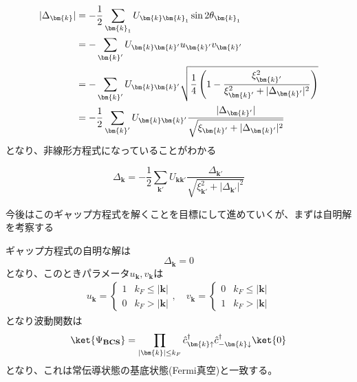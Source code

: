 \documentclass[dvipdfmx, 11pt, a4paper]{jsarticle}
\numberwithin{equation}{section}
\theoremstyle{definition}
\begin{document}
    \begin{align}
        |\Delta_{\bm{k}}|  &= - \frac{1}{2} \sum_{\bm{k}_1} U_{\bm{k}\bm{k}_1}  \sin 2 \theta_{\bm{k}_1} \notag \\
        &=  -  \sum_{\bm{k}'} U_{\bm{k}\bm{k}'} u_{\bm{k}'} v_{\bm{k}'} \notag \\
        &= -  \sum_{\bm{k}'} U_{\bm{k}\bm{k}'} \sqrt{\frac{1}{4}\left( 1 - \frac{\xi_{\bm{k}'}^2}{\xi_{\bm{k}'}^2 + |\Delta_{\bm{k}'}|^2} \right)} \notag \\
        &= - \frac{1}{2} \sum_{\bm{k}'} U_{\bm{k}\bm{k}'} \frac{|\Delta_{\bm{k}'}|}{\sqrt{\xi_{\bm{k}'}+|\Delta_{\bm{k}'}|^2}}
    \end{align}
    となり、非線形方程式になっていることがわかる
    \begin{definition}[絶対零度におけるギャップ方程式]
        \begin{equation}
            \Delta_{\bm{k}} = - \frac{1}{2} \sum_{\bm{k}'} U_{\bm{k}\bm{k}'} \frac{\Delta_{\bm{k}'}}{\sqrt{\xi_{\bm{k}'}^2+|\Delta_{\bm{k}'}|^2}}
        \end{equation}
    \end{definition}
    今後はこのギャップ方程式を解くことを目標にして進めていくが、まずは自明解を考察する
    \begin{note}[ギャップ方程式の自明解]
        ギャップ方程式の自明な解は
        \begin{equation}
            \Delta_{\bm{k}} = 0
        \end{equation}
        となり、このときパラメータ$u_{\bm{k}},v_{\bm{k}}$は
        \begin{align}
            u_{\bm{k}} = 
            \left\{
            \begin{matrix}
                1&k_F \le |\bm{k}|\\
                0&k_F > |\bm{k}|
            \end{matrix}
            \right.,\quad 
            v_{\bm{k}} = 
            \left\{
            \begin{matrix}
                0&k_F \le |\bm{k}|\\
                1&k_F > |\bm{k}|
            \end{matrix}
            \right.
        \end{align}
        となり波動関数は
        \begin{align}
            \ket{\Psi_{\textbf{BCS}}} = \prod_{|\bm{k}| \le k_F} \hat{c}_{\bm{k}\uparrow}^\dagger \hat{c}_{-\bm{k}\downarrow}^\dagger \ket{0}
        \end{align}
        となり、これは常伝導状態の基底状態(Fermi真空)と一致する。
    \end{note}
\end{document}
